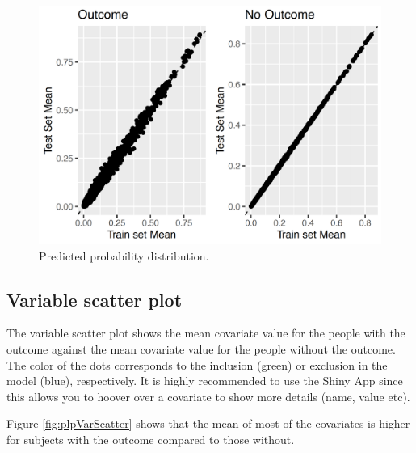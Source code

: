 \documentclass[]{book}
\begin{document}
\begin{figure}

{\centering \includegraphics[width=1\linewidth]{images/PatientLevelPrediction/generalizability} 

}

\caption{Predicted probability distribution.}\label{fig:plpTestTrain}
\end{figure}

\subsection{Variable scatter plot}\label{variable-scatter-plot}

The variable scatter plot shows the mean covariate value for the people
with the outcome against the mean covariate value for the people without
the outcome. The color of the dots corresponds to the inclusion (green)
or exclusion in the model (blue), respectively. It is highly recommended
to use the Shiny App since this allows you to hoover over a covariate to
show more details (name, value etc).

Figure \ref{fig:plpVarScatter} shows that the mean of most of the
covariates is higher for subjects with the outcome compared to those
without.
\end{document}
